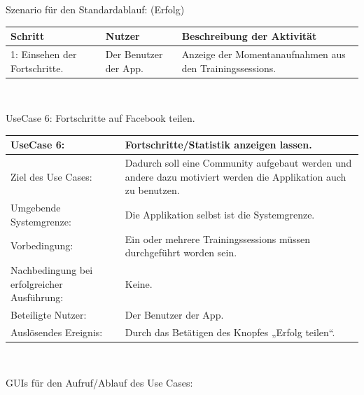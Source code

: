 \documentclass[FIPLY_base.tex]{subfiles}
\begin{document}
	\newpage
	Szenario für den Standardablauf: (Erfolg)
	\ \\
	\begin{center}	
		\def\arraystretch{1.3}%
		\begin{tabular}{| p{3cm} | p{3cm} | p{6cm} |}
			\hline
			\textbf{Schritt} & \textbf{Nutzer} & \textbf{Beschreibung der Aktivität}  \\ \hline 
			1: Einsehen der Fortschritte. & Der Benutzer der App. & Anzeige der Momentanaufnahmen aus den Trainingssessions.\\ \hline
		\end{tabular} \\
	\end{center}
	
	UseCase 6: Fortschritte auf Facebook teilen.
	\begin{center}
		\def\arraystretch{1.3}%
		\begin{tabular}{| p{5cm} | p{5cm} |}
			\hline
			UseCase 6: & Fortschritte/Statistik anzeigen lassen. \\ \hline 
			Ziel des Use Cases: & Dadurch soll eine Community aufgebaut werden und andere dazu motiviert werden die Applikation auch zu benutzen.  \\ \hline
			Umgebende Systemgrenze: & Die Applikation selbst ist die Systemgrenze. \\ \hline
			Vorbedingung: & Ein oder mehrere Trainingssessions müssen durchgeführt worden sein.  \\ \hline
			Nachbedingung bei erfolgreicher Ausführung: & Keine.  \\ \hline
			Beteiligte Nutzer: & Der Benutzer der App. \\ \hline
			Auslösendes Ereignis: & Durch das Betätigen des Knopfes „Erfolg teilen“. \\ \hline
		\end{tabular} \\
	\end{center}
	GUIs für den Aufruf/Ablauf des Use Cases:
\end{document}
